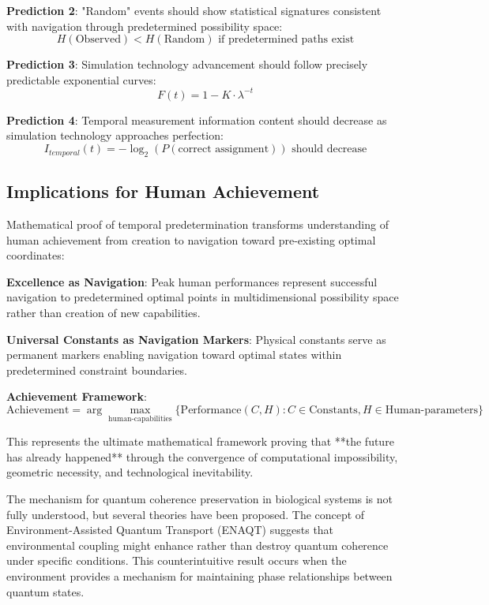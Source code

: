 \documentclass[12pt,a4paper]{article}
\theoremstyle{definition}
\begin{document}
{\textbf{Prediction 2}: "Random" events should show statistical signatures consistent with navigation through predetermined possibility space:
$$H(\text{Observed}) < H(\text{Random}) \text{ if predetermined paths exist}$$

\textbf{Prediction 3}: Simulation technology advancement should follow precisely predictable exponential curves:
$$F(t) = 1 - K \cdot \lambda^{-t}$$

\textbf{Prediction 4}: Temporal measurement information content should decrease as simulation technology approaches perfection:
$$I_{temporal}(t) = -\log_2(P(\text{correct assignment})) \text{ should decrease}$$

\subsection{Implications for Human Achievement}

Mathematical proof of temporal predetermination transforms understanding of human achievement from creation to navigation toward pre-existing optimal coordinates:

\textbf{Excellence as Navigation}: Peak human performances represent successful navigation to predetermined optimal points in multidimensional possibility space rather than creation of new capabilities.

\textbf{Universal Constants as Navigation Markers}: Physical constants serve as permanent markers enabling navigation toward optimal states within predetermined constraint boundaries.

\textbf{Achievement Framework}:
$$\text{Achievement} = \arg\max_{\text{human-capabilities}} \{\text{Performance}(C, H) : C \in \text{Constants}, H \in \text{Human-parameters}\}$$

This represents the ultimate mathematical framework proving that **the future has already happened** through the convergence of computational impossibility, geometric necessity, and technological inevitability.

The mechanism for quantum coherence preservation in biological systems is not fully understood, but several theories have been proposed. The concept of Environment-Assisted Quantum Transport (ENAQT) \cite{rebentrost2009environment} suggests that environmental coupling might enhance rather than destroy quantum coherence under specific conditions. This counterintuitive result occurs when the environment provides a mechanism for maintaining phase relationships between quantum states.

}
\end{document}
